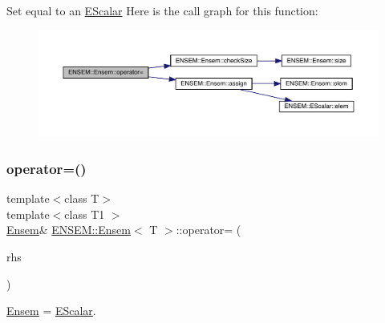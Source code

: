 Set equal to an \mbox{\hyperlink{classENSEM_1_1EScalar}{E\+Scalar}} Here is the call graph for this function\+:
\nopagebreak
\begin{figure}[H]
\begin{center}
\leavevmode
\includegraphics[width=350pt]{d7/d3e/classENSEM_1_1Ensem_a376ab0239198595a09384c13d7a1ad1c_cgraph}
\end{center}
\end{figure}
\mbox{\label{classENSEM_1_1Ensem_a376ab0239198595a09384c13d7a1ad1c}} 
\subsubsection{\texorpdfstring{operator=()}{operator=()}\hspace{0.1cm}{\footnotesize\ttfamily [6/10]}}
{\footnotesize\ttfamily template$<$class T$>$ \\
template$<$class T1 $>$ \\
\mbox{\hyperlink{classENSEM_1_1Ensem}{Ensem}}\& \mbox{\hyperlink{classENSEM_1_1Ensem}{E\+N\+S\+E\+M\+::\+Ensem}}$<$ T $>$\+::operator= (\begin{DoxyParamCaption}\item[{const \mbox{\hyperlink{classENSEM_1_1EScalar}{E\+Scalar}}$<$ T1 $>$ \&}]{rhs }\end{DoxyParamCaption})\hspace{0.3cm}{\ttfamily [inline]}}



\mbox{\hyperlink{classENSEM_1_1Ensem}{Ensem}} = \mbox{\hyperlink{classENSEM_1_1EScalar}{E\+Scalar}}. 

